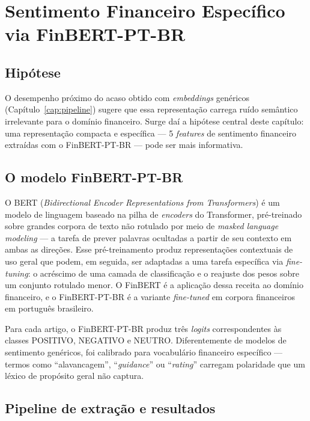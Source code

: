 \chapter{Sentimento Financeiro Específico via FinBERT-PT-BR}\label{cap:sentimento}

\section{Hipótese}

O desempenho próximo do acaso obtido com \textit{embeddings} genéricos (Capítulo~\ref{cap:pipeline}) sugere que essa representação carrega ruído semântico irrelevante para o domínio financeiro. Surge daí a hipótese central deste capítulo: uma representação compacta e específica --- 5 \textit{features} de sentimento financeiro extraídas com o FinBERT-PT-BR \cite{souza2023} --- pode ser mais informativa.

\section{O modelo FinBERT-PT-BR}

O BERT (\textit{Bidirectional Encoder Representations from Transformers}) \cite{devlin2019} é um modelo de linguagem baseado na pilha de \textit{encoders} do Transformer, pré-treinado sobre grandes corpora de texto não rotulado por meio de \textit{masked language modeling} --- a tarefa de prever palavras ocultadas a partir de seu contexto em ambas as direções. Esse pré-treinamento produz representações contextuais de uso geral que podem, em seguida, ser adaptadas a uma tarefa específica via \textit{fine-tuning}: o acréscimo de uma camada de classificação e o reajuste dos pesos sobre um conjunto rotulado menor. O FinBERT \cite{araci2019} é a aplicação dessa receita ao domínio financeiro, e o FinBERT-PT-BR \cite{souza2023} é a variante \textit{fine-tuned} em corpora financeiros em português brasileiro.

Para cada artigo, o FinBERT-PT-BR produz três \textit{logits} correspondentes às classes POSITIVO, NEGATIVO e NEUTRO. Diferentemente de modelos de sentimento genéricos, foi calibrado para vocabulário financeiro específico --- termos como ``alavancagem'', ``\textit{guidance}'' ou ``\textit{rating}'' carregam polaridade que um léxico de propósito geral não captura.

\section{Pipeline de extração e resultados}

